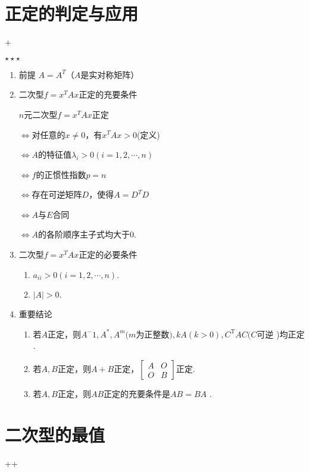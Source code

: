 \section{正定的判定与应用}
\DOne+\DTwoThree

$\star\star\star$

\begin{enumerate}
    \item 前提
          $A=A^T$（$A$是实对称矩阵）
    \item 二次型$f=x^TAx$正定的充要条件 \DTwo

          $n$元二次型$f=x^{T}Ax$正定

          $\Leftrightarrow$对任意的$x\neq 0$，有$x^{T}Ax>0$(定义)

          $\Leftrightarrow A$的特征值$\lambda_{i}>0(i=1,2,\cdots,n)$

          $\Leftrightarrow f$的正惯性指数$p=n$

          $\Leftrightarrow$存在可逆矩阵$D$，使得$A=D^{T}D$

          $\Leftrightarrow A$与$E$合同

          $\Leftrightarrow A$的各阶顺序主子式均大于0.
    \item 二次型$f=x^TAx$正定的必要条件
          \begin{enumerate}
              \item $a_{ii}>0\left(i=1,2,\cdots,n\right).$
              \item $| A| > 0$.
          \end{enumerate}
    \item 重要结论
          \begin{enumerate}
              \item 若$A$正定，则$A^-1,A^{*},A^{m}(m$为正整数$),kA(k>0),C^{\mathrm{T}}AC(C$可逆 )均正定 .

              \item 若$A,B$正定，则$A+B$正定，$\begin{bmatrix}A&O\\O&B\end{bmatrix}$正定.

              \item ${\text{若}A,B}$正定，则$AB$正定的充要条件是$AB= BA$ .
          \end{enumerate}

\end{enumerate}

\section{二次型的最值}
\DOne+\DTwoTwo+\DTwoThree

